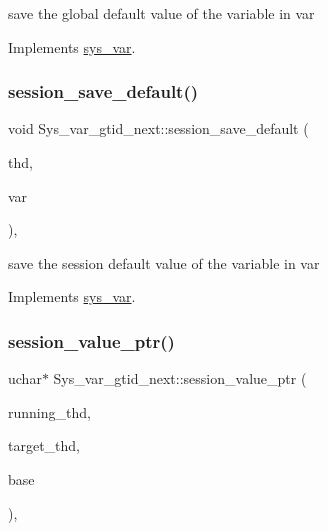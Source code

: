 save the global default value of the variable in var 

Implements \mbox{\hyperlink{classsys__var}{sys\+\_\+var}}.

\mbox{\label{classSys__var__gtid__next_a18793c8f29d000b6e34d04475f0cdde5}} 
\subsubsection{\texorpdfstring{session\+\_\+save\+\_\+default()}{session\_save\_default()}}
{\footnotesize\ttfamily void Sys\+\_\+var\+\_\+gtid\+\_\+next\+::session\+\_\+save\+\_\+default (\begin{DoxyParamCaption}\item[{T\+HD $\ast$}]{thd,  }\item[{\mbox{\hyperlink{classset__var}{set\+\_\+var}} $\ast$}]{var }\end{DoxyParamCaption})\hspace{0.3cm}{\ttfamily [inline]}, {\ttfamily [virtual]}}

save the session default value of the variable in var 

Implements \mbox{\hyperlink{classsys__var}{sys\+\_\+var}}.

\mbox{\label{classSys__var__gtid__next_ac722dd24aaa78bec018a831e13864bd4}} 
\subsubsection{\texorpdfstring{session\+\_\+value\+\_\+ptr()}{session\_value\_ptr()}}
{\footnotesize\ttfamily uchar$\ast$ Sys\+\_\+var\+\_\+gtid\+\_\+next\+::session\+\_\+value\+\_\+ptr (\begin{DoxyParamCaption}\item[{T\+HD $\ast$}]{running\+\_\+thd,  }\item[{T\+HD $\ast$}]{target\+\_\+thd,  }\item[{L\+E\+X\+\_\+\+S\+T\+R\+I\+NG $\ast$}]{base }\end{DoxyParamCaption})\hspace{0.3cm}{\ttfamily [inline]}, {\ttfamily [virtual]}}

